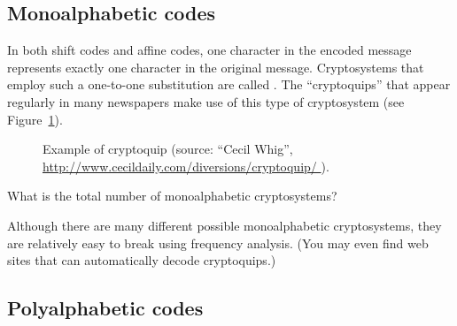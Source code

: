 \subsection{Monoalphabetic codes}

In both shift codes and affine codes, one character in the encoded message represents exactly one character in the original message. Cryptosystems that employ such a one-to-one substitution are called .
The ``cryptoquips''  that appear regularly in many newspapers make use of this type of cryptosystem (see Figure~\ref{fig:cryptoquip}).

\begin{figure}[h]
\caption{Example of cryptoquip (source: ``Cecil Whig'', \url{http://www.cecildaily.com/diversions/cryptoquip/ }).}
\label{fig:cryptoquip}
\end{figure}

\begin{exercise}{}
What is the total number of monoalphabetic cryptosystems?
\end{exercise}
Although there are many different possible monoalphabetic cryptosystems, they are relatively easy to break using frequency analysis. (You may even find web sites that can automatically decode cryptoquips.)


\subsection{Polyalphabetic codes}\label{subsec:polyCodes}

